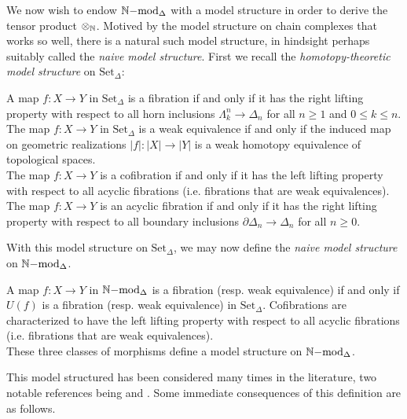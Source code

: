 We now wish to endow $\mathbb{N}\mathrm{-mod}_{\Delta}$ with a model structure in order to derive the tensor product $\otimes_{\mathbb{N}}$. 
Motived by the model structure on chain complexes that works so well, 
there is a natural such model structure, in hindsight perhaps suitably called the \textit{naive model structure}.
First we recall the \textit{homotopy-theoretic model structure} on $\text{Set}_{\Delta}$:
\begin{definition}
A map $f: X \to Y$ in $\text{Set}_{\Delta}$ is a fibration if and only if it has the right lifting property with respect to all horn inclusions 
$\Lambda^n_k \to \Delta_n$ for all $n \ge 1$ and $0 \le k \le n$.\\
\indent The map $f: X \to Y$ in $\text{Set}_{\Delta}$ is a weak equivalence if and only if the induced map on geometric realizations
$|f|: |X| \to |Y|$ is a weak homotopy equivalence of topological spaces.\\
\indent The map $f:X \to Y$ is a cofibration if and only if it has the left lifting property 
with respect to all acyclic fibrations (i.e. fibrations that are weak equivalences).\\
\indent The map $f: X \to Y$ is an acyclic fibration if and only if it has the right lifting property with respect to all boundary inclusions
$\partial \Delta_n \to \Delta_n$ for all $n \ge 0$. \cite[I.11]{simpho}
\end{definition}
With this model structure on $\text{Set}_{\Delta}$, we may now define the \textit{naive model structure} on $\mathbb{N}\mathrm{-mod}_{\Delta}$.
\begin{definition}A map $f: X \to Y$ in $\mathbb{N}\mathrm{-mod}_{\Delta}$ is a fibration (resp. weak equivalence) 
if and only if $U(f)$ is a 
fibration (resp. weak equivalence) in $\text{Set}_{\Delta}$. 
Cofibrations are characterized to have the left lifting property with respect to all acyclic fibrations 
(i.e. fibrations that are weak equivalences).\\
\indent These three classes of 
morphisms define a model structure on $\mathbb{N}\mathrm{-mod}_{\Delta}$.
\end{definition}
This model structured has been considered many times in the literature, two notable references being \cite{kansemi} and \cite{rezksemi}.
Some immediate consequences of this definition are as follows.
